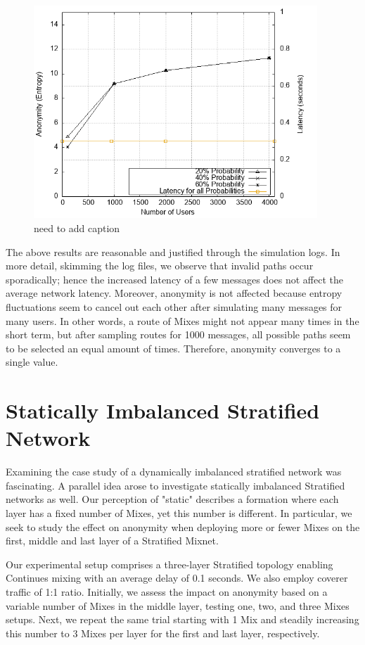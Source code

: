 \documentclass[logo,msc,cyber]{infthesis}   %
\begin{document}
\begin{figure}[h!]
    \centering
    \includegraphics[height=8cm]{figures/simulator_extentions/mix_failure.png}
    \caption{need to add caption}
    \label{fig:dynamic-crash-probability}
\end{figure}    


The above results are reasonable and justified through the simulation logs. In
more detail, skimming the log files, we observe that invalid paths occur
sporadically; hence the increased latency of a few messages does not affect the
average network latency. Moreover, anonymity is not affected because entropy
fluctuations seem to cancel out each other after simulating many messages for
many users. In other words, a route of Mixes might not appear many times in the
short term, but after sampling routes for 1000 messages, all possible paths seem
to be selected an equal amount of times. Therefore, anonymity converges to a
single value.

\section{Statically Imbalanced Stratified Network}

Examining the case study of a dynamically imbalanced stratified network was
fascinating. A parallel idea arose to investigate statically imbalanced
Stratified networks as well. Our perception of "static" describes a formation
where each layer has a fixed number of Mixes, yet this number is different. In
particular, we seek to study the effect on anonymity when deploying more or
fewer Mixes on the first, middle and last layer of a Stratified Mixnet.

Our experimental setup comprises a three-layer Stratified topology enabling
Continues mixing with an average delay of 0.1 seconds. We also employ coverer
traffic of 1:1 ratio. Initially, we assess the impact on anonymity based on a
variable number of Mixes in the middle layer, testing one, two, and three
Mixes setups. Next, we repeat the same trial starting with 1 Mix and steadily
increasing this number to 3 Mixes per layer for the first and last layer,
respectively.
\end{document}
